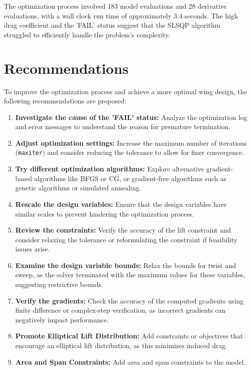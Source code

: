 \documentclass{article}
\begin{document}
The optimization process involved 183 model evaluations and 28 derivative evaluations, with a wall clock run time of approximately 3.4 seconds. The high drag coefficient and the 'FAIL' status suggest that the SLSQP algorithm struggled to efficiently handle the problem's complexity.

\section{Recommendations}

To improve the optimization process and achieve a more optimal wing design, the following recommendations are proposed:

\begin{enumerate}
    \item \textbf{Investigate the cause of the 'FAIL' status:} Analyze the optimization log and error messages to understand the reason for premature termination.
    \item \textbf{Adjust optimization settings:} Increase the maximum number of iterations (\texttt{maxiter}) and consider reducing the tolerance to allow for finer convergence.
    \item \textbf{Try different optimization algorithms:} Explore alternative gradient-based algorithms like BFGS or CG, or gradient-free algorithms such as genetic algorithms or simulated annealing.
    \item \textbf{Rescale the design variables:} Ensure that the design variables have similar scales to prevent hindering the optimization process.
    \item \textbf{Review the constraints:} Verify the accuracy of the lift constraint and consider relaxing the tolerance or reformulating the constraint if feasibility issues arise.
    \item \textbf{Examine the design variable bounds:} Relax the bounds for twist and sweep, as the solver terminated with the maximum values for these variables, suggesting restrictive bounds.
    \item \textbf{Verify the gradients:} Check the accuracy of the computed gradients using finite difference or complex-step verification, as incorrect gradients can negatively impact performance.
    \item \textbf{Promote Elliptical Lift Distribution:} Add constraints or objectives that encourage an elliptical lift distribution, as this minimizes induced drag.
    \item \textbf{Area and Span Constraints:} Add area and span constraints to the model.
\end{enumerate}
\end{document}
